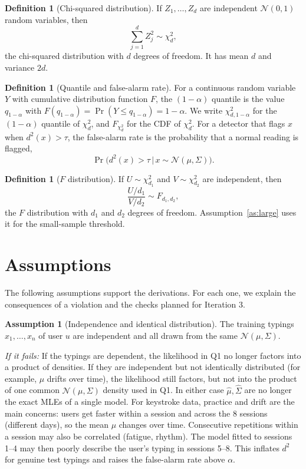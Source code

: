 \documentclass[11pt]{article}
\theoremstyle{definition}
\newtheorem{definition}[theorem]{Definition}
\newtheorem{assumption}{Assumption}
\begin{document}
\begin{definition}[Chi-squared distribution]\label{def:chi2}
If $Z_1,\dots,Z_d$ are independent $\mathcal N(0,1)$ random variables, then
\[
\sum_{j=1}^d Z_j^2\sim\chi^2_d,
\]
the chi-squared distribution with $d$ degrees of freedom. It has mean $d$ and variance $2d$.
\end{definition}

\begin{definition}[Quantile and false-alarm rate]\label{def:quant}
For a continuous random variable $Y$ with cumulative distribution function $F$, the $(1-\alpha)$ quantile is the value $q_{1-\alpha}$ with $F(q_{1-\alpha})=\Pr(Y\le q_{1-\alpha})=1-\alpha$. We write $\chi^2_{d,1-\alpha}$ for the $(1-\alpha)$ quantile of $\chi^2_d$, and $F_{\chi^2_d}$ for the CDF of $\chi^2_d$. For a detector that flags $x$ when $d^2(x)>\tau$, the false-alarm rate is the probability that a normal reading is flagged,
\[
\Pr\big(d^2(x)>\tau \,\big|\, x\sim\mathcal N(\mu,\Sigma)\big).
\]
\end{definition}

\begin{definition}[$F$ distribution]\label{def:fdist}
If $U\sim\chi^2_{d_1}$ and $V\sim\chi^2_{d_2}$ are independent, then
\[
\frac{U/d_1}{V/d_2}\sim F_{d_1,d_2},
\]
the $F$ distribution with $d_1$ and $d_2$ degrees of freedom. Assumption~\ref{as:large} uses it for the small-sample threshold.
\end{definition}

\section{Assumptions}
The following assumptions support the derivations. For each one, we explain the consequences of a violation and the checks planned for Iteration 3.

\begin{assumption}[Independence and identical distribution]\label{as:iid}
The training typings $x_1,\dots,x_n$ of user $u$ are independent and all drawn from the same $\mathcal N(\mu,\Sigma)$.
\end{assumption}
\noindent\textit{If it fails:} If the typings are dependent, the likelihood in Q1 no longer factors into a product of densities. If they are independent but not identically distributed (for example, $\mu$ drifts over time), the likelihood still factors, but not into the product of one common $\mathcal N(\mu,\Sigma)$ density used in Q1. In either case $\hat\mu,\hat\Sigma$ are no longer the exact MLEs of a single model. For keystroke data, practice and drift are the main concerns: users get faster within a session and across the 8 sessions (different days), so the mean $\mu$ changes over time. Consecutive repetitions within a session may also be correlated (fatigue, rhythm). The model fitted to sessions 1--4 may then poorly describe the user's typing in sessions 5--8. This inflates $d^2$ for genuine test typings and raises the false-alarm rate above $\alpha$.
\end{document}
